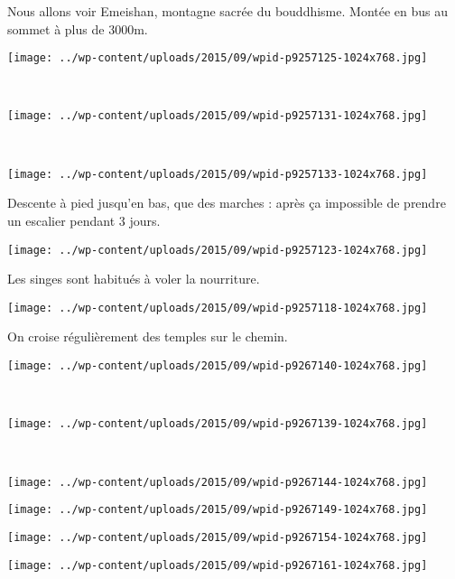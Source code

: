  Nous allons voir Emeishan, montagne sacrée du bouddhisme. Montée en bus au sommet à plus de 3000m. 
\begin{center} \texttt{[image: ../wp-content/uploads/2015/09/wpid-p9257125-1024x768.jpg]} \end{center}
~\\
\begin{center} \texttt{[image: ../wp-content/uploads/2015/09/wpid-p9257131-1024x768.jpg]} \end{center}
\vspace{-\topsep}
\pagebreak
~\\
\vspace{0.75mm}
\begin{center} \texttt{[image: ../wp-content/uploads/2015/09/wpid-p9257133-1024x768.jpg]} \end{center}

 Descente à pied jusqu'en bas, que des marches : après ça impossible de prendre un escalier pendant 3 jours. 
\begin{center} \texttt{[image: ../wp-content/uploads/2015/09/wpid-p9257123-1024x768.jpg]} \end{center}
\vspace{-\topsep}
\pagebreak
 
 Les singes sont habitués à voler la nourriture. 
\begin{center} \texttt{[image: ../wp-content/uploads/2015/09/wpid-p9257118-1024x768.jpg]} \end{center}

 On croise régulièrement des temples sur le chemin. 
\begin{center} \texttt{[image: ../wp-content/uploads/2015/09/wpid-p9267140-1024x768.jpg]} \end{center}
\vspace{-\topsep}
\pagebreak

~
\vspace{0.5mm}
\begin{center} \texttt{[image: ../wp-content/uploads/2015/09/wpid-p9267139-1024x768.jpg]} \end{center}
~
\begin{center} \texttt{[image: ../wp-content/uploads/2015/09/wpid-p9267144-1024x768.jpg]} \end{center}
\begin{center} \texttt{[image: ../wp-content/uploads/2015/09/wpid-p9267149-1024x768.jpg]} \end{center}
\begin{center} \texttt{[image: ../wp-content/uploads/2015/09/wpid-p9267154-1024x768.jpg]} \end{center}
\begin{center} \texttt{[image: ../wp-content/uploads/2015/09/wpid-p9267161-1024x768.jpg]} \end{center}

